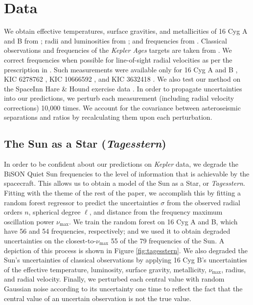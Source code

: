 \documentclass[manuscript]{aastex}
\begin{document}
\section{Data} 
We obtain effective temperatures, surface gravities, and metallicities of 16 Cyg A and B from \citet{2009A&A...508L..17R}; radii and luminosities from \citet{2013MNRAS.433.1262W}; and frequencies from \citet{2015MNRAS.446.2959D}. Classical observations and frequencies of the \emph{Kepler Ages} targets are taken from \citet{2015MNRAS.452.2127S}. We correct frequencies when possible for line-of-sight radial velocities as per the prescription in \citet{2014MNRAS.445L..94D}. Such measurements were available only for 16 Cyg A and B \cite{2002ApJS..141..503N}, KIC 6278762 \citep{2002AJ....124.1144L}, KIC 10666592 \citep{2013A&A...554A..84M}, and KIC 3632418 \citep{2006AstL...32..759G}. We also test our method on the SpaceInn Hare \& Hound exercise data \citep{spaceinn}. In order to propagate uncertainties into our predictions, we perturb each measurement (including radial velocity corrections) 10,000 times. We account for the covariance between asteroseismic separations and ratios by recalculating them upon each perturbation. 

\subsection{The Sun as a Star (\emph{Tagesstern})}
In order to be confident about our predictions on \emph{Kepler} data, we degrade the BiSON Quiet Sun frequencies \citep{2014MNRAS.439.2025D} to the level of information that is achievable by the spacecraft. This allows us to obtain a model of the Sun as a Star, or \emph{Tagesstern}. Fitting with the theme of the rest of the paper, we accomplish this by fitting a random forest regressor to predict the uncertainties $\sigma$ from the observed radial orders $n$, spherical degree $\ell$, and distance from the frequency maximum oscillation power $\nu_{\max}$. We train the random forest on 16 Cyg A and B, which have 56 and 54 frequencies, respectively; and we used it to obtain degraded uncertainties on the closest-to-$\nu_{\max}$ 55 of the 79 frequencies of the Sun. A depiction of this process is shown in Figure \ref{fig:tagesstern}. We also degraded the Sun's uncertainties of classical observations by applying 16 Cyg B's uncertainties of the effective temperature, luminosity, surface gravity, metallicity, $\nu_{\max}$, radius, and radial velocity. Finally, we perturbed each central value with random Gaussian noise according to its uncertainty one time to reflect the fact that the central value of an uncertain observation is not the true value. 
\end{document}
